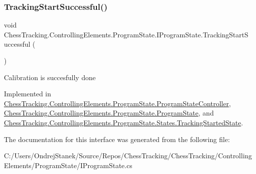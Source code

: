 \subsubsection{\texorpdfstring{TrackingStartSuccessful()}{TrackingStartSuccessful()}}
{\footnotesize\ttfamily void Chess\+Tracking.\+Controlling\+Elements.\+Program\+State.\+I\+Program\+State.\+Tracking\+Start\+Successful (\begin{DoxyParamCaption}{ }\end{DoxyParamCaption})}



Calibration is succesfully done 



Implemented in \mbox{\hyperlink{class_chess_tracking_1_1_controlling_elements_1_1_program_state_1_1_program_state_controller_a029929ed04eab54893eaed751f7bcae2}{Chess\+Tracking.\+Controlling\+Elements.\+Program\+State.\+Program\+State\+Controller}}, \mbox{\hyperlink{class_chess_tracking_1_1_controlling_elements_1_1_program_state_1_1_program_state_a120f53f07c30eb53b34a7e1de82a4226}{Chess\+Tracking.\+Controlling\+Elements.\+Program\+State.\+Program\+State}}, and \mbox{\hyperlink{class_chess_tracking_1_1_controlling_elements_1_1_program_state_1_1_states_1_1_tracking_started_state_aa1840f95aae0d1aa49a898b1387bdda5}{Chess\+Tracking.\+Controlling\+Elements.\+Program\+State.\+States.\+Tracking\+Started\+State}}.



The documentation for this interface was generated from the following file\+:\begin{DoxyCompactItemize}
\item 
C\+:/\+Users/\+Ondrej\+Stanek/\+Source/\+Repos/\+Chess\+Tracking/\+Chess\+Tracking/\+Controlling\+Elements/\+Program\+State/I\+Program\+State.\+cs\end{DoxyCompactItemize}
